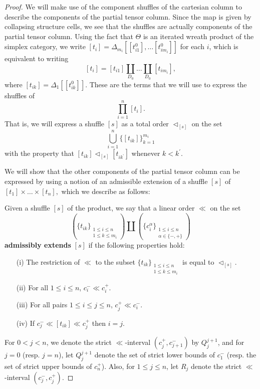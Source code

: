 \documentclass[10pt]{amsart}
\numberwithin{equation}{section}
\theoremstyle{plain}   %
\theoremstyle{remark}
\theoremstyle{plain}
\newcommand{\dfn}{\textbf}
\begin{document}
\begin{proof}
We will make use of the component shuffles of the cartesian column to describe the components of the partial  tensor column.   Since the map is given by collapsing structure cells, we see that the shuffles are actually components of the partial tensor column.  Using the fact that \(\Theta\) is an iterated wreath product of the simplex category, we write \([t_i]=\Delta_{m_i}[[t^0_{i1}],\dots [t^0_{im_i}]]\) for each \(i\), which is equivalent to writing \[[t_i]=[t_{i1}]\coprod_{D_0} \dots \coprod_{D_0} [t_{im_i}],\] where \([t_{ik}]=\Delta_1[[t^0_{ik}]]\).  These are the terms that we will use to express the shuffles of \[\prod_{i=1}^n [t_i].\]  That is, we will express a shuffle \([s]\) as a total order \(\lhd_{[s]}\) on the set \[\bigcup_{i=1}^n \{[t_{ik}]\}_{k=1}^{m_i}\] with the property that \([t_{ik}] \lhd_{[s]} [t_{ik^\prime}]\) whenever \(k<k^\prime\).    

We will show that the other components of the partial tensor column can be expressed by using a notion of an admissible extension of a shuffle \([s]\) of \([t_1]\times \dots \times [t_n],\) which we describe as follows: 

Given a shuffle \([s]\) of the product, we say that a linear order \(\ll\) on the set \[\left(\{t_{ik}\}_{\substack{1\leq i\leq n\\1\leq k \leq m_i}}\right) \coprod \left(\{c_i^\alpha\}_{\substack{1\leq i \leq n \\ \alpha\in\{-,+\}}}\right)\] \dfn{admissibly extends} \([s]\) if the following properties hold:
\begin{enumerate}
\item[(i)] The restriction of \(\ll\) to the subset \(\{t_{ik}\}_{\substack{1\leq i\leq n \\1\leq k \leq m_i}}\) is equal to \(\lhd_{[s]}\).  
\item[(ii)] For all \(1\leq i\leq n\), \(c_i^- \ll c_i^+\).
\item[(iii)] For all pairs \(1\leq i \leq j \leq n\), \(c_j^+ \ll c_i^-\).
\item[(iv)] If \(c_j^- \ll [t_{ik}] \ll c_j^+\) then \(i=j\).  
\end{enumerate}
For \(0<j<n\), we denote the strict \(\ll\)-interval \((c_j^+,c_{j+1}^-)\) by \(Q^{j+1}_j\), and for \(j=0\) (resp. \(j=n\)), let \(Q_j^{j+1}\) denote the set of strict lower bounds of \(c_1^-\) (resp. the set of strict upper bounds of \(c_n^+\)).  Also, for \(1\leq j\leq n\), let \(R_j\) denote the strict \(\ll\)-interval \((c_j^-,c_j^+)\).  


\end{proof}
\end{document}
